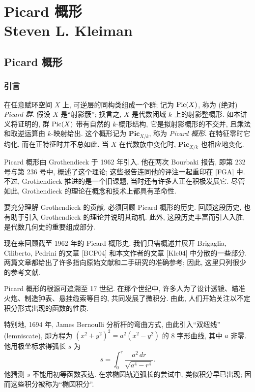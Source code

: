 \part[\parttoc{Picard 概形}{Steven L. Kleiman}]{%
%
Picard 概形\\[12pt]{\normalfont\large Steven L. Kleiman}}
\chapter{Picard 概形}\label{ch09}
\section{引言}\label{ch09:sec91}
在任意赋环空间 $X$ 上, 可逆层的同构类组成一个群; 记为 $\operatorname{Pic}(X)$, 称为 (绝对) \emph{Picard 群}. 假设 $X$ 是“射影簇”; 换言之, $X$ 是代数闭域 $k$ 上的射影整概形. 如本讲义将证明的, 群 $\operatorname{Pic}(X)$ 带有自然的 $k$-概形结构, 它是拟射影概形的不交并, 且乘法和取逆运算由 $k$-映射给出. 这个概形记为 $\mathbf{Pic}_{X/k}$, 称为 \emph{Picard 概形}. 在特征零时它约化, 而在正特征时并不总如此. 当 $X$ 在代数族中变化时, $\mathbf{Pic}_{X/k}$ 也相应地变化.

Picard 概形由 Grothendieck 于 1962 年引入. 他在两次 Bourbaki 报告, 即第 232 号与第 236 号中, 概述了这个理论; 这些报告连同他的评注一起重印在 [FGA] 中. 不过, Grothendieck 推进的是一个旧课题, 当时还有许多人正在积极发展它. 尽管如此, Grothendieck 的理论在概念和技术上都具有革命性.

要充分理解 Grothendieck 的贡献, 必须回顾 Picard 概形的历史. 回顾这段历史, 也有助于引入 Grothendieck 的理论并说明其动机. 此外, 这段历史丰富而引人入胜, 是代数几何史的重要组成部分.

现在来回顾截至 1962 年的 Picard 概形史. 我们只需概述并展开 Brigaglia, Ciliberto, Pedrini 的文章 [BCP04] 和本文作者的文章 [Kle04] 中分散的一些部分. 两篇文章都给出了许多指向原始文献和二手研究的准确参考; 因此, 这里只列很少的参考文献.

Picard 概形的根源可追溯至 17 世纪. 在那个世纪中, 许多人为了设计透镜、瞄准火炮、制造钟表、悬挂缆索等目的, 共同发展了微积分. 由此, 人们开始关注以不定积分形式出现的函数的性质.

特别地, 1694 年, James Bernoulli 分析杆的弯曲方式, 由此引入“双纽线” (lemniscate), 即方程为 $(x^2+y^2)^2=a^2(x^2-y^2)$ 的 8 字形曲线, 其中 $a$ 非零. 他用极坐标求得弧长 $s$ 为
\[
s=\int_0^r\frac{a^2\,dr}{\sqrt{a^4-r^4}}.
\]
他猜测 $s$ 不能用初等函数表达. 在求椭圆轨道弧长的尝试中, 类似积分早已出现; 因而这些积分被称为“椭圆积分”.

